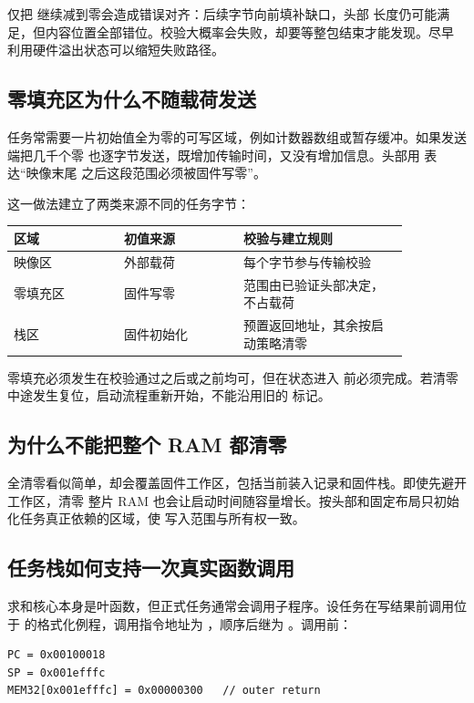 仅把  继续减到零会造成错误对齐：后续字节向前填补缺口，头部
长度仍可能满足，但内容位置全部错位。校验大概率会失败，却要等整包结束才能发现。尽早
利用硬件溢出状态可以缩短失败路径。

\subsection{零填充区为什么不随载荷发送}

任务常需要一片初始值全为零的可写区域，例如计数器数组或暂存缓冲。如果发送端把几千个零
也逐字节发送，既增加传输时间，又没有增加信息。头部用  表达“映像末尾
之后这段范围必须被固件写零”。

这一做法建立了两类来源不同的任务字节：

\begin{longtable}{|L{0.24\linewidth}|L{0.26\linewidth}|L{0.36\linewidth}|}
\hline
{}
区域 & 初值来源 & 校验与建立规则 \\ \hline
映像区 & 外部载荷 & 每个字节参与传输校验 \\ \hline
零填充区 & 固件写零 & 范围由已验证头部决定，不占载荷 \\ \hline
栈区 & 固件初始化 & 预置返回地址，其余按启动策略清零 \\ \hline
\end{longtable}

零填充必须发生在校验通过之后或之前均可，但在状态进入  前必须完成。若清零
中途发生复位，启动流程重新开始，不能沿用旧的  标记。

\subsection{为什么不能把整个 RAM 都清零}

全清零看似简单，却会覆盖固件工作区，包括当前装入记录和固件栈。即使先避开工作区，清零
整片 RAM 也会让启动时间随容量增长。按头部和固定布局只初始化任务真正依赖的区域，使
写入范围与所有权一致。

\subsection{任务栈如何支持一次真实函数调用}

求和核心本身是叶函数，但正式任务通常会调用子程序。设任务在写结果前调用位于
 的格式化例程，调用指令地址为 ，顺序后继为
。调用前：

\begin{lstlisting}
PC = 0x00100018
SP = 0x001efffc
MEM32[0x001efffc] = 0x00000300   // outer return
\end{lstlisting}

